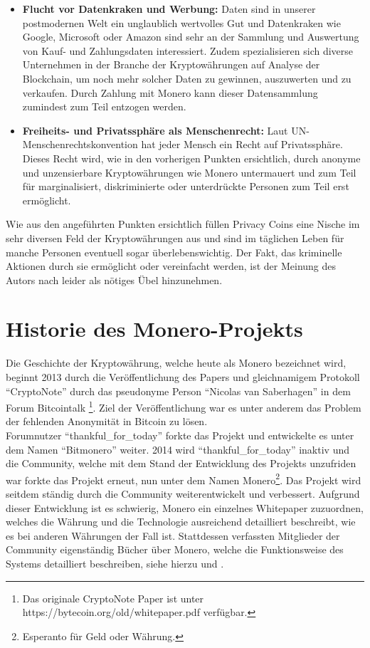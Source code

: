 \begin{itemize}
    \item \textbf{Flucht vor Datenkraken und Werbung:} Daten sind in unserer postmodernen Welt ein unglaublich wertvolles Gut und Datenkraken wie Google, Microsoft oder Amazon sind sehr an der Sammlung und Auswertung von Kauf- und Zahlungsdaten interessiert.
    Zudem spezialisieren sich diverse Unternehmen in der Branche der Kryptowährungen auf Analyse der Blockchain, um noch mehr solcher Daten zu gewinnen, auszuwerten und zu verkaufen. Durch Zahlung mit Monero kann dieser Datensammlung zumindest zum Teil entzogen werden.
    \item \textbf{Freiheits- und Privatssphäre als Menschenrecht:} Laut UN-Menschenrechtskonvention hat jeder Mensch ein Recht auf Privatssphäre\cite[vgl. Artikel 12]{UniNations1948}. Dieses Recht wird, wie in den vorherigen Punkten ersichtlich,
    durch anonyme und unzensierbare Kryptowährungen wie Monero untermauert und zum Teil für marginalisiert, diskriminierte oder unterdrückte Personen zum Teil erst ermöglicht.
\end{itemize}
Wie aus den angeführten Punkten ersichtlich füllen Privacy Coins eine Nische im sehr diversen Feld der Kryptowährungen aus und sind im täglichen Leben für manche Personen eventuell sogar überlebenswichtig. Der Fakt, das kriminelle Aktionen durch sie ermöglicht oder
vereinfacht werden, ist der Meinung des Autors nach leider als nötiges Übel hinzunehmen.

\chapter{Historie des Monero-Projekts}
Die Geschichte der Kryptowährung, welche heute als Monero bezeichnet wird, beginnt 2013 durch die Veröffentlichung des Papers und gleichnamigem Protokoll ``CryptoNote'' durch das pseudonyme Person ``Nicolas van Saberhagen'' in dem Forum Bitcointalk
\footnote{Das originale CryptoNote Paper ist unter https://bytecoin.org/old/whitepaper.pdf verfügbar. }. Ziel der Veröffentlichung war es unter anderem das Problem der fehlenden Anonymität in Bitcoin zu lösen\cite[vgl. Seite 1]{Saberhagen2013}. \\

Forumnutzer ``thankful\_for\_today'' forkte das Projekt und entwickelte es unter dem Namen ``Bitmonero'' weiter. 2014 wird ``thankful\_for\_today'' inaktiv und die Community, welche mit dem Stand der Entwicklung des Projekts unzufriden war 
forkte das Projekt erneut, nun unter dem Namen Monero\footnote{Esperanto für Geld oder Währung.}. Das Projekt wird seitdem ständig durch die Community weiterentwickelt und verbessert. Aufgrund dieser Entwicklung ist es schwierig,
Monero ein einzelnes Whitepaper zuzuordnen, welches die Währung und die Technologie ausreichend detailliert beschreibt, wie es bei anderen Währungen der Fall ist. Stattdessen verfassten Mitglieder der Community eigenständig
Bücher über Monero, welche die Funktionsweise des Systems detailliert beschreiben, siehe hierzu \cite{Koe2020} und \cite{SerHack2019}.

